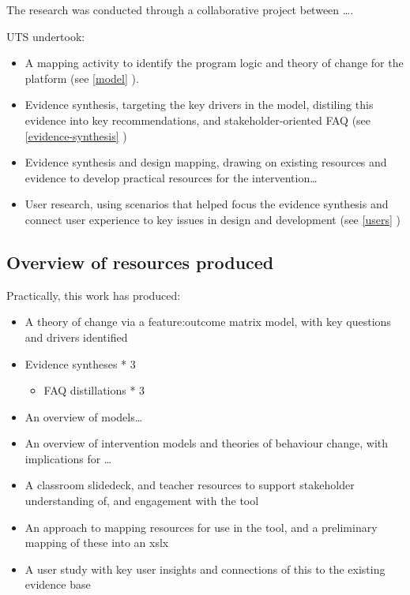 \documentclass[
]{book}
\providecommand{\tightlist}{%
  \setlength{\itemsep}{0pt}\setlength{\parskip}{0pt}}
\begin{document}
The research was conducted through a collaborative project between \ldots.

UTS undertook:

\begin{itemize}
\tightlist
\item
  A mapping activity to identify the program logic and theory of change for the platform (see \ref{model} ).
\item
  Evidence synthesis, targeting the key drivers in the model, distiling this evidence into key recommendations, and stakeholder-oriented FAQ (see \ref{evidence-synthesis} )
\item
  Evidence synthesis and design mapping, drawing on existing resources and evidence to develop practical resources for the intervention\ldots{}
\item
  User research, using scenarios that helped focus the evidence synthesis and connect user experience to key issues in design and development (see \ref{users} )
\end{itemize}

\hypertarget{overview-of-resources-produced}{%
\subsection{Overview of resources produced}\label{overview-of-resources-produced}}

Practically, this work has produced:

\begin{itemize}
\tightlist
\item
  A theory of change via a feature:outcome matrix model, with key questions and drivers identified
\item
  Evidence syntheses * 3

  \begin{itemize}
  \tightlist
  \item
    FAQ distillations * 3
  \end{itemize}
\item
  An overview of models\ldots{}
\item
  An overview of intervention models and theories of behaviour change, with implications for \ldots{}
\item
  A classroom slidedeck, and teacher resources to support stakeholder understanding of, and engagement with the tool
\item
  An approach to mapping resources for use in the tool, and a preliminary mapping of these into an xslx
\item
  A user study with key user insights and connections of this to the existing evidence base
\end{itemize}
\end{document}
